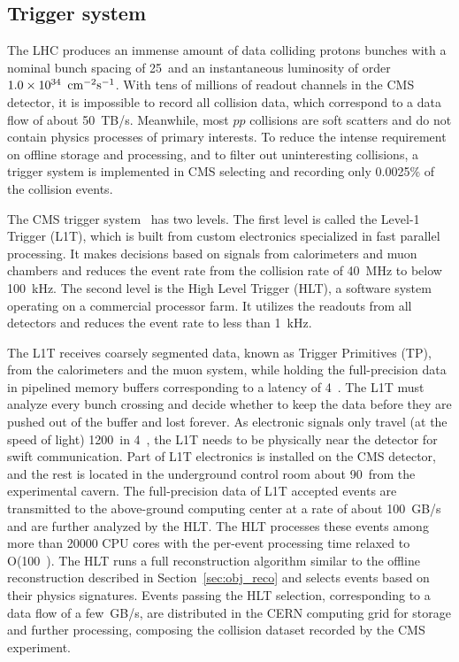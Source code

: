 \subsection{Trigger system}\label{sec:trigger}

The LHC produces an immense amount of data colliding protons bunches with a nominal bunch spacing of 25~\ns and an instantaneous luminosity of order $1.0 \times 10^{34}~\,\text{cm}^{-2}\text{s}^{-1}$. 
With tens of millions of readout channels in the CMS detector, it is impossible to record all collision data, which correspond to a data flow of about 50~TB/s. 
Meanwhile, most $pp$ collisions are soft scatters and do not contain physics processes of primary interests.
To reduce the intense requirement on offline storage and processing, and to filter out uninteresting collisions,
a trigger system is implemented in CMS selecting and recording only 0.0025\% of the collision events.

The CMS trigger system~\cite{Collaboration_2008, l1t_perform} has two levels. 
The first level is called the Level-1 Trigger (L1T), which is built from custom electronics specialized in fast parallel processing.
It makes decisions based on signals from calorimeters and muon chambers and reduces the event rate from the collision rate of 40~MHz to below 100~kHz.
The second level is the High Level Trigger (HLT), a software system operating on a commercial processor farm.
It utilizes the readouts from all detectors and reduces the event rate to less than 1~kHz. 

The L1T receives coarsely segmented data, known as Trigger Primitives (TP), from the calorimeters and the muon system, 
while holding the full-precision data in pipelined memory buffers corresponding to a latency of 4~\mus.
The L1T must analyze every bunch crossing and decide whether to keep the data before they are pushed out of the buffer and lost forever.
As electronic signals only travel (at the speed of light) 1200~\meter in 4~\mus, the L1T needs to be physically near the detector for swift communication.
Part of L1T electronics is installed on the CMS detector, and the rest is located in the underground control room about 90~\meter from the experimental cavern.
The full-precision data of L1T accepted events are transmitted to the above-ground computing center at a rate of about 100~GB/s and are further analyzed by the HLT. 
The HLT processes these events among more than 20000 CPU cores with the per-event processing time relaxed to O(100~\ms).
The HLT runs a full reconstruction algorithm similar to the offline reconstruction described in Section~\ref{sec:obj_reco}
and selects events based on their physics signatures. 
Events passing the HLT selection, corresponding to a data flow of a few~GB/s, 
are distributed in the CERN computing grid for storage and further processing,
composing the collision dataset recorded by the CMS experiment. 

